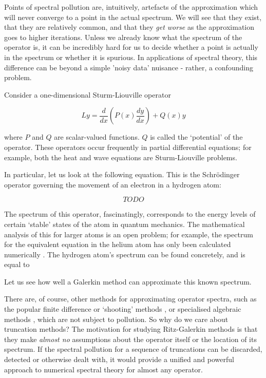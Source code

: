 \documentclass[../main.tex]{subfiles}
\begin{document}
Points of spectral pollution are, intuitively, artefacts of the approximation which will never converge to a point in the actual spectrum. We will see that they exist, that they are relatively common, and that they \emph{get worse} as the approximation goes to higher iterations. Unless we already
know what the spectrum of the operator is, it can be incredibly hard for us to decide whether a point is actually in the spectrum or whether it is
spurious. In applications of spectral theory, this difference can be beyond a simple 'noisy data' nuisance - rather, a confounding problem.

\begin{example}
Consider a one-dimensional Sturm-Liouville operator

$$Ly = \frac{d}{dx}(P(x)\frac{dy}{dx}) + Q(x)y$$

where $P$ and $Q$ are scalar-valued functions. $Q$ is called the `potential' of the operator. These operators occur frequently in partial differential equations; for example, both the heat and wave equations are Sturm-Liouville problems.

In particular, let us look at the following equation. This is the Schr\"odinger operator governing the movement of an electron in a hydrogen atom:

$$TODO$$

The spectrum of this operator, fascinatingly, corresponds to the energy levels of certain `stable' states of the atom in quantum mechanics. 
The mathematical analysis of this for larger atoms is an open problem; for example,
the spectrum for the equivalent equation in the helium atom has only been calculated numerically \cite{davies1995spectral}. The hydrogen atom's
spectrum can be found concretely, and is equal to %

Let us see how well a Galerkin method can approximate this known spectrum.
\end{example}

There are, of course, other methods for approximating operator spectra, such as the popular finite difference or `shooting' methods \cite{suli2003introduction}, or specialised algebraic methods \cite{aceto2006numerical}, which are not subject to pollution. So why do we
care about truncation methods?
The motivation for studying Ritz-Galerkin methods is that they make \emph{almost no} assumptions about the operator itself or the location of its spectrum. 
If the spectral pollution for a sequence of truncations can be discarded, detected or otherwise dealt with, it would provide a unified and 
powerful approach to numerical spectral theory for almost any operator.
\end{document}
